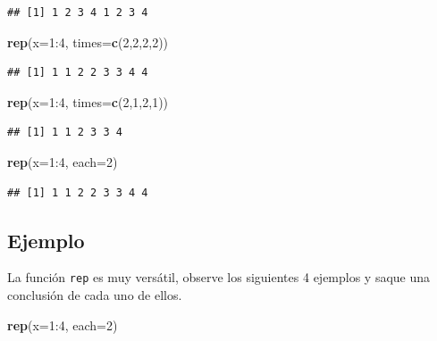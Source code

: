 \documentclass[10pt,]{krantz}
\makeatletter
\newenvironment{Shaded}{\begin{snugshade}}{\end{snugshade}}
\newcommand{\KeywordTok}[1]{\textcolor[rgb]{0.13,0.29,0.53}{\textbf{{#1}}}}
\newcommand{\DataTypeTok}[1]{\textcolor[rgb]{0.13,0.29,0.53}{{#1}}}
\newcommand{\DecValTok}[1]{\textcolor[rgb]{0.00,0.00,0.81}{{#1}}}
\newcommand{\NormalTok}[1]{{#1}}
\newenvironment{kframe}{%
\medskip{}
\setlength{\fboxsep}{.8em}
 \def\at@end@of@kframe{}%
 \ifinner\ifhmode%
  \def\at@end@of@kframe{\end{minipage}}%
  \begin{minipage}{\columnwidth}%
 \fi\fi%
 \def\FrameCommand##1{\hskip\@totalleftmargin \hskip-\fboxsep
 \colorbox{shadecolor}{##1}\hskip-\fboxsep
     \hskip-\linewidth \hskip-\@totalleftmargin \hskip\columnwidth}%
 \MakeFramed {\advance\hsize-\width
   \@totalleftmargin\z@ \linewidth\hsize
   \@setminipage}}%
 {\par\unskip\endMakeFramed%
 \at@end@of@kframe}
\renewenvironment{Shaded}{\begin{kframe}}{\end{kframe}}
\makeatother
\begin{document}
\begin{verbatim}
## [1] 1 2 3 4 1 2 3 4
\end{verbatim}

\begin{Shaded}
\begin{Highlighting}[]
\KeywordTok{rep}\NormalTok{(}\DataTypeTok{x=}\DecValTok{1}\NormalTok{:}\DecValTok{4}\NormalTok{, }\DataTypeTok{times=}\KeywordTok{c}\NormalTok{(}\DecValTok{2}\NormalTok{,}\DecValTok{2}\NormalTok{,}\DecValTok{2}\NormalTok{,}\DecValTok{2}\NormalTok{))}
\end{Highlighting}
\end{Shaded}

\begin{verbatim}
## [1] 1 1 2 2 3 3 4 4
\end{verbatim}

\begin{Shaded}
\begin{Highlighting}[]
\KeywordTok{rep}\NormalTok{(}\DataTypeTok{x=}\DecValTok{1}\NormalTok{:}\DecValTok{4}\NormalTok{, }\DataTypeTok{times=}\KeywordTok{c}\NormalTok{(}\DecValTok{2}\NormalTok{,}\DecValTok{1}\NormalTok{,}\DecValTok{2}\NormalTok{,}\DecValTok{1}\NormalTok{))}
\end{Highlighting}
\end{Shaded}

\begin{verbatim}
## [1] 1 1 2 3 3 4
\end{verbatim}

\begin{Shaded}
\begin{Highlighting}[]
\KeywordTok{rep}\NormalTok{(}\DataTypeTok{x=}\DecValTok{1}\NormalTok{:}\DecValTok{4}\NormalTok{, }\DataTypeTok{each=}\DecValTok{2}\NormalTok{)}
\end{Highlighting}
\end{Shaded}

\begin{verbatim}
## [1] 1 1 2 2 3 3 4 4
\end{verbatim}

\subsection*{Ejemplo}\label{ejemplo-12}


La función \texttt{rep} es muy versátil, observe los siguientes 4
ejemplos y saque una conclusión de cada uno de ellos.

\begin{Shaded}
\begin{Highlighting}[]
\KeywordTok{rep}\NormalTok{(}\DataTypeTok{x=}\DecValTok{1}\NormalTok{:}\DecValTok{4}\NormalTok{, }\DataTypeTok{each=}\DecValTok{2}\NormalTok{)}
\end{Highlighting}
\end{Shaded}
\end{document}
